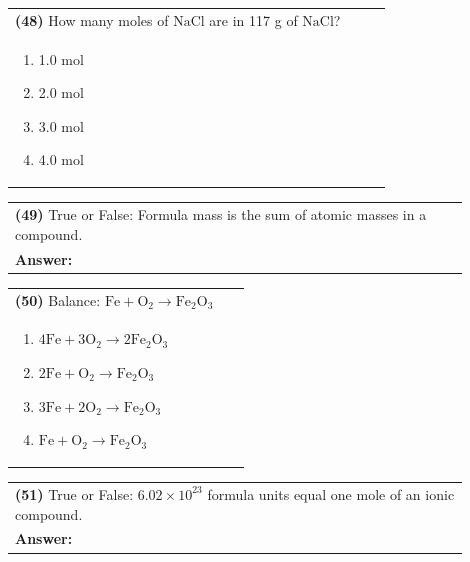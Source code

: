 \documentclass{article}
\begin{document}
{\vspace{0.2cm}
\noindent \begin{tabular}{|p{0.9\linewidth}|}
\hline
\vspace{0.2cm}
\textbf{(48)} How many moles of $\mathrm{NaCl}$ are in 117 g of $\mathrm{NaCl}$?\\
\begin{minipage}[t]{0.85\linewidth}
\begin{enumerate}[label=\alph*.]
\item 1.0 mol
\item 2.0 mol
\item 3.0 mol
\item 4.0 mol
\end{enumerate}
\end{minipage}\\
\hline
\end{tabular}
\newpage

\vspace{0.2cm}
\noindent \begin{tabular}{|p{0.9\linewidth}|}
\hline
\vspace{0.2cm}
\textbf{(49)} True or False: Formula mass is the sum of atomic masses in a compound.\\
\textbf{Answer:} \underline{\hspace{2cm}}\\
\hline
\end{tabular}

\vspace{0.2cm}
\noindent \begin{tabular}{|p{0.9\linewidth}|}
\hline
\vspace{0.2cm}
\textbf{(50)} Balance: $\mathrm{Fe + O_2 \rightarrow Fe_2O_3}$\\
\begin{minipage}[t]{0.85\linewidth}
\begin{enumerate}[label=\alph*.]
\item $\mathrm{4Fe + 3O_2 \rightarrow 2Fe_2O_3}$
\item $\mathrm{2Fe + O_2 \rightarrow Fe_2O_3}$
\item $\mathrm{3Fe + 2O_2 \rightarrow Fe_2O_3}$
\item $\mathrm{Fe + O_2 \rightarrow Fe_2O_3}$
\end{enumerate}
\end{minipage}\\
\hline
\end{tabular}

\vspace{0.2cm}
\noindent \begin{tabular}{|p{0.9\linewidth}|}
\hline
\vspace{0.2cm}
\textbf{(51)} True or False: $6.02\times10^{23}$ formula units equal one mole of an ionic compound.\\
\textbf{Answer:} \underline{\hspace{2cm}}\\
\hline
\end{tabular}

}
\end{document}
